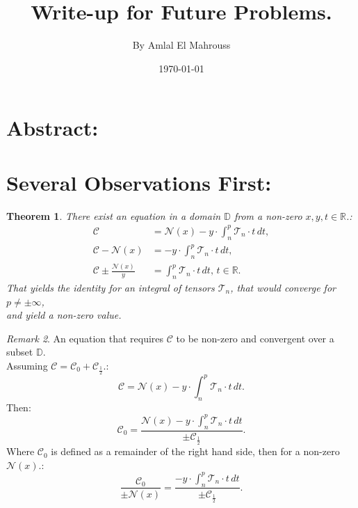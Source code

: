\documentclass[10pt]{article}
\title{%
	\vspace{-1.5em}%
	\large\textbf{Write-up for Future Problems.}%
}
\author{By Amlal El Mahrouss}
\date{\today}
\theoremstyle{plain}
\newtheorem{theorem}{Theorem}[section]
\theoremstyle{definition}
\theoremstyle{remark}
\newtheorem{remark}[theorem]{Remark}
\begin{document}
	
	\maketitle
	\tableofcontents
	\newpage

\section{Abstract:}

\section{Several Observations First:}

\begin{theorem}
There exist an equation in a domain $\mathbb{D}$ from a non-zero $x, y, t \in \mathbb{R}$.:
\begin{align*}
    \mathcal{C} &= \mathcal{N}(x) - y \cdot \int_{n}^{p} \mathcal{T}_{n} \cdot t \, dt,\\
    \mathcal{C} - \mathcal{N}(x) &= -y \cdot \int_{n}^{p} \mathcal{T}_{n} \cdot t \, dt,\\
    \mathcal{C} \pm \frac{\mathcal{N}(x)}{y} &= \int_{n}^{p} \mathcal{T}_{n} \cdot t \, dt, \, t \in \mathbb{R}.
\end{align*}
That yields the identity for an integral of tensors $\mathcal{T}_n$, that would converge for $p \neq \pm \infty$,\\ and yield a non-zero value.
\end{theorem}

\begin{remark}
An equation that requires $\mathcal{C}$ to be non-zero and convergent over a subset $\mathbb{D}$.\\
Assuming $\mathcal{C} = \mathcal{C}_{0} + \mathcal{C}_{\frac{1}{2}}.$:
\begin{equation}
	\mathcal{C} = \mathcal{N}(x) - y \cdot \int_{n}^{p} \mathcal{T}_{n} \cdot t \, dt.
\end{equation}
Then:
\begin{equation}
	\mathcal{C}_{0} = \frac{\mathcal{N}(x) - y \cdot \int_{n}^{p} \mathcal{T}_{n} \cdot t \, dt}{\pm \mathcal{C}_{\frac{1}{2}}}.
\end{equation}
Where $\mathcal{C}_{0}$ is defined as a remainder of the right hand side, then for a non-zero $\mathcal{N}(x)$.:
\begin{equation}
	\frac{\mathcal{C}_{0}}{\pm \mathcal{N}(x) } = \frac{-y \cdot \int_{n}^{p} \mathcal{T}_{n} \cdot t \, dt}{\pm \mathcal{C}_{\frac{1}{2}}}.
\end{equation}
\end{remark}
\end{document}
